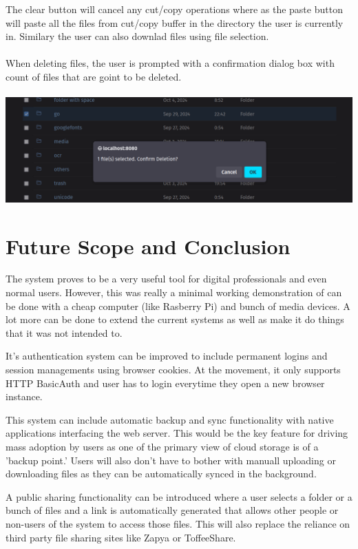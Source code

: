 \documentclass[12pt]{article}
\makeatletter
\let\inserttitle\@title
\makeatother
\begin{document}
The clear button will cancel any cut/copy operations where as the paste button will paste all the files from cut/copy buffer in the directory the user is currently in. Similary the user can also downlad files using file selection. \\ \\

When deleting files, the user is prompted with a confirmation dialog box with count of files that are goint to be deleted. \\ \\
\includegraphics[width=\linewidth]{ss/8.cm-delete-prompt.png}


\section{Future Scope and Conclusion}
\vspace{2cm}
\quad\quad
The \inserttitle{} system proves to be a very useful tool for digital professionals and even normal users. However, this was really a minimal working demonstration of can be done with a cheap computer (like Rasberry Pi) and bunch of media devices. A lot more can be done to extend the current systems as well as make it do things that it was not intended to. \\
\par
It's authentication system can be improved to include permanent logins and session managements using browser cookies. At the movement, it only supports HTTP BasicAuth and user has to login everytime they open a new browser instance. \\
\par
This system can include automatic backup and sync functionality with native applications interfacing the web server. This would be the key feature for driving mass adoption by users as one of the primary view of cloud storage is of a 'backup point.' Users will also don't have to bother with manuall uploading or downloading files as they can be automatically synced in the background. \\
\par
A public sharing functionality can be introduced where a user selects a folder or a bunch of files and a link is automatically generated that allows other people or non-users of the system to access those files. This will also replace the reliance on third party file sharing sites like Zapya or ToffeeShare.
\end{document}
